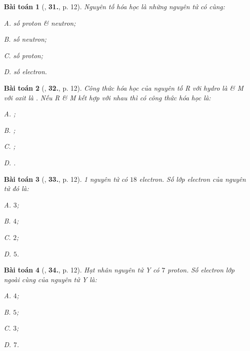 \documentclass{article}
\numberwithin{equation}{section}
\newtheorem{baitoan}{Bài toán}[section]
\begin{document}
\begin{baitoan}[\cite{An2011}, \textbf{31.}, p. 12]
	Nguyên tố hóa học là những nguyên tử có cùng:
	\begin{enumerate*}
		\item[{\rm\sf A.}] số proton \& neutron;
		\item[{\rm\sf B.}] số neutron;
		\item[{\rm\sf C.}] số proton;
		\item[{\rm\sf D.}] số electron.
	\end{enumerate*}
\end{baitoan}

\begin{baitoan}[\cite{An2011}, \textbf{32.}, p. 12]
	Công thức hóa học của nguyên tố R với hydro là  \& M với oxit là . Nếu R \& M kết hợp với nhau thì có công thức hóa học là:
	\begin{enumerate*}
		\item[{\rm\sf A.}] ;
		\item[{\rm\sf B.}] ;
		\item[{\rm\sf C.}] ;
		\item[{\rm\sf D.}] .
	\end{enumerate*}
\end{baitoan}

\begin{baitoan}[\cite{An2011}, \textbf{33.}, p. 12]
	1 nguyên tử có $18$ electron. Số lớp electron của nguyên tử đó là:
	\begin{enumerate*}
		\item[{\rm\sf A.}] $3$;
		\item[{\rm\sf B.}] $4$;
		\item[{\rm\sf C.}] $2$;
		\item[{\rm\sf D.}] $5$.
	\end{enumerate*}
\end{baitoan}

\begin{baitoan}[\cite{An2011}, \textbf{34.}, p. 12]
	Hạt nhân nguyên tử Y có $7$ proton. Số electron lớp ngoài cùng của nguyên tử Y là:
	\begin{enumerate*}
		\item[{\rm\sf A.}] $4$;
		\item[{\rm\sf B.}] $5$;
		\item[{\rm\sf C.}] $3$;
		\item[{\rm\sf D.}] $7$.
	\end{enumerate*}
\end{baitoan}
\end{document}
